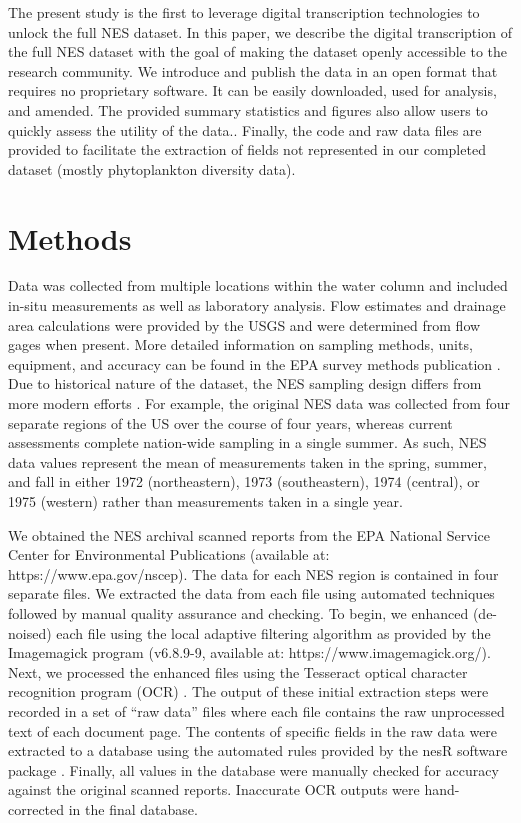 \documentclass[journal abbreviations, manuscript]{copernicus}
\begin{document}
The present study is the first to leverage digital transcription technologies to unlock the full NES dataset. In this paper, we describe the digital transcription of the full NES dataset with the goal of making the dataset openly accessible to the research community. We introduce and publish the data in an open format that requires no proprietary software. It can be easily downloaded, used for analysis, and amended. The provided summary statistics and figures also allow users to quickly assess the utility of the data.. Finally, the code and raw data files are provided to facilitate the extraction of fields not represented in our completed dataset (mostly phytoplankton diversity data).

\section{Methods}

Data was collected from multiple locations within the water column and included in-situ measurements as well as laboratory analysis. Flow estimates and drainage area calculations were provided by the USGS and were determined from flow gages when present.  More detailed information on sampling methods, units, equipment, and accuracy can be found in the EPA survey methods publication \citep{nes-methods}. Due to historical nature of the dataset, the NES sampling design differs from more modern efforts \citep{nla-methods}. For example, the original NES data was collected from four separate regions of the US over the course of four years, whereas current assessments complete nation-wide sampling in a single summer. As such, NES data values represent the mean of measurements taken in the spring, summer, and fall in either 1972 (northeastern), 1973 (southeastern), 1974 (central), or 1975 (western) rather than measurements taken in a single year.

We obtained the NES archival scanned reports from the EPA National Service Center for Environmental Publications (available at: https://www.epa.gov/nscep). The data for each NES region is contained in four separate files. We extracted the data from each file using automated techniques followed by manual quality assurance and checking. To begin, we enhanced (de-noised) each file using the local adaptive filtering algorithm as provided by the Imagemagick program (v6.8.9-9, available at: https://www.imagemagick.org/). Next, we processed the enhanced files using the Tesseract optical character recognition program (OCR) \citep{R-tesseract, smith2007overview}. The output of these initial extraction steps were recorded in a set of “raw data” files where each file contains the raw unprocessed text of each document page. The contents of specific fields in the raw data were extracted to a database using the automated rules provided by the nesR software package \citep{R-nesR}. Finally, all values in the database were manually checked for accuracy against the original scanned reports. Inaccurate OCR outputs were hand-corrected in the final database. 
\end{document}
